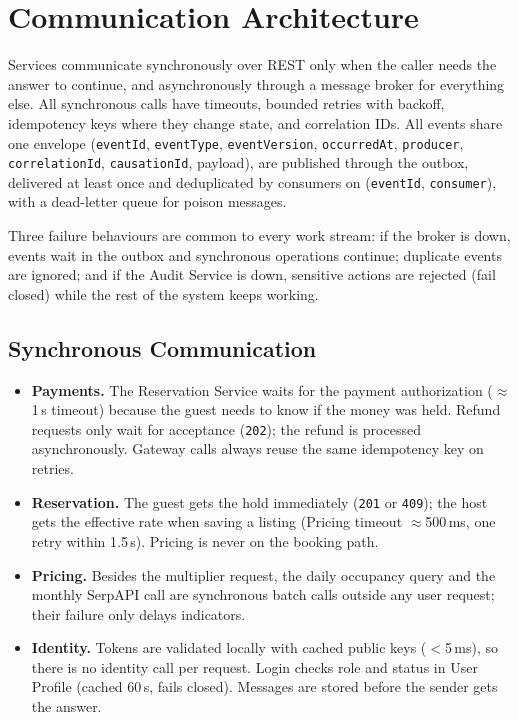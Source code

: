 \section{Communication Architecture}

Services communicate synchronously over REST only when the caller needs the
answer to continue, and asynchronously through a message broker for everything
else. All synchronous calls have timeouts, bounded retries with backoff,
idempotency keys where they change state, and correlation IDs. All events share
one envelope (\texttt{eventId}, \texttt{eventType}, \texttt{eventVersion},
\texttt{occurredAt}, \texttt{producer}, \texttt{correlationId},
\texttt{causationId}, payload), are published through the outbox, delivered at
least once and deduplicated by consumers on (\texttt{eventId},
\texttt{consumer}), with a dead-letter queue for poison messages.

Three failure behaviours are common to every work stream: if the broker is
down, events wait in the outbox and synchronous operations continue; duplicate
events are ignored; and if the Audit Service is down, sensitive actions are
rejected (fail closed) while the rest of the system keeps working.

\subsection{Synchronous Communication}

\begin{itemize}
  \item \textbf{Payments.} The Reservation Service waits for the payment
    authorization ($\approx$1\,s timeout) because the guest needs to know if
    the money was held. Refund requests only wait for acceptance
    (\texttt{202}); the refund is processed asynchronously. Gateway calls
    always reuse the same idempotency key on retries.
  \item \textbf{Reservation.} The guest gets the hold immediately
    (\texttt{201} or \texttt{409}); the host gets the effective rate when
    saving a listing (Pricing timeout $\approx$500\,ms, one retry within
    1.5\,s). Pricing is never on the booking path.
  \item \textbf{Pricing.} Besides the multiplier request, the daily occupancy
    query and the monthly SerpAPI call are synchronous batch calls outside any
    user request; their failure only delays indicators.
  \item \textbf{Identity.} Tokens are validated locally with cached public
    keys ($<$5\,ms), so there is no identity call per request. Login checks
    role and status in User Profile (cached 60\,s, fails closed). Messages are
    stored before the sender gets the answer.
\end{itemize}

